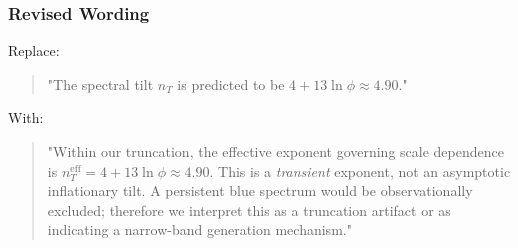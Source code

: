 \subsubsection*{Revised Wording}
Replace:
\begin{quote}
"The spectral tilt $n_T$ is predicted to be $4 + 13\ln\phi \approx 4.90$."
\end{quote}
With:
\begin{quote}
"Within our truncation, the effective exponent governing scale dependence is $n_T^{\text{eff}} = 4 + 13\ln\phi \approx 4.90$. This is a \textit{transient} exponent, not an asymptotic inflationary tilt. A persistent blue spectrum would be observationally excluded; therefore we interpret this as a truncation artifact or as indicating a narrow-band generation mechanism."
\end{quote}
